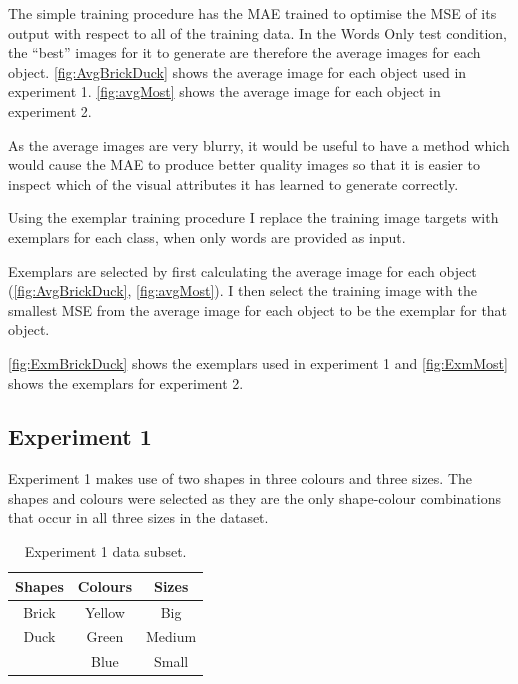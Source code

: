 The simple training procedure has the MAE trained to optimise the \ac{MSE} of its output with respect to all of the training data. In the Words Only test condition, the ``best'' images for it to generate are therefore the average images for each object. \autoref{fig:AvgBrickDuck} shows the average image for each object used in experiment 1. \autoref{fig:avgMost} shows the average image for each object in experiment 2.

As the average images are very blurry, it would be useful to have a method which would cause the \ac{MAE} to produce better quality images so that it is easier to inspect which of the visual attributes it has learned to generate correctly.

Using the exemplar training procedure I replace the training image targets with exemplars for each class, when only words are provided as input.

Exemplars are selected by first calculating the average image for each object (\autoref{fig:AvgBrickDuck}, \ref{fig:avgMost}). I then select the training image with the smallest \ac{MSE} from the average image for each object to be the exemplar for that object. 

\autoref{fig:ExmBrickDuck} shows the exemplars used in experiment 1 and \autoref{fig:ExmMost} shows the exemplars for experiment 2.



\subsection{Experiment 1}
Experiment 1 makes use of two shapes in three colours and three sizes. The shapes and colours were selected as they are the only shape-colour combinations that occur in all three sizes in the dataset.

\begin{table}[h]
\centering
\begin{tabular}{|c|c|c|}
\hline

\textbf{Shapes}  & \textbf{Colours} & \textbf{Sizes}\\ \hline \hline
Brick  & Yellow  & Big \\ \hline
Duck   & Green   & Medium \\ \hline
& Blue & Small \\ \hline
			  
			
\end{tabular}
\caption{Experiment 1 data subset.}
\label{tab:6_exp1_data} 
\end{table}

